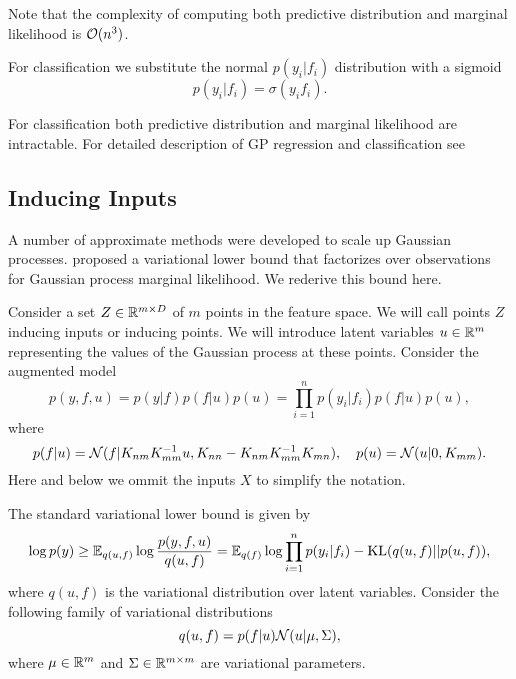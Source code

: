   Note that the complexity of computing both predictive distribution and 
  marginal likelihood is $\mathcal{O}(n^3)$.

  For classification we substitute the normal $p(y_i | f_i)$ distribution
  with a sigmoid
  \[
    p(y_i | f_i) = \sigma(y_i f_i).
  \]

  For classification both predictive distribution and marginal likelihood
  are intractable. For detailed description of GP regression and 
  classification see \citet{rasmussen2006}

\subsection{Inducing Inputs}
\label{inducing_inputs}

  A number of approximate methods were developed to scale up Gaussian processes.
  \citet{hensman2013} proposed a variational lower bound that factorizes over
  observations for Gaussian process marginal likelihood. We rederive 
  this bound here.

  Consider a set $Z \in \mathbb{R}^{m \times D}$ of $m$ points in the feature space. 
  We will call points $Z$ inducing inputs or inducing points.
  We will introduce latent variables $u \in \mathbb{R}^m$ representing the values of 
  the Gaussian process at these points. Consider the augmented model
  \[
    p(y, f, u) = p(y | f) p(f | u) p(u) = \prod_{i = 1}^ n p(y_i | f_i) p(f | u) p(u),
  \]
  where 
  \begin{equation}
  \label{priors}
    p(f | u) = \mathcal{N}(f | K_{nm} K_{mm}^{-1} u, K_{nn} - K_{nm} K_{mm}^{-1} K_{mn}),~~~p(u)=
    \mathcal{N}(u | 0, K_{mm}).
  \end{equation}
  Here and below we ommit the inputs $X$ to simplify the notation.
 
  The standard variational lower bound is given by
  \begin{equation}
  \label{standard_elbo}
    \log p(y) \ge \mathbb{E}_{q(u, f)} \log \frac {p(y, f, u)} {q(u, f)} = 
    \mathbb{E}_{q(f)} \log \prod_{i=1}^n p(y_i | f_i) - \mbox{KL}(q(u, f) || p(u, f)),
  \end{equation}
  where $q(u, f)$ is the variational distribution over latent variables.
  Consider the following family of variational distributions
  \begin{equation}
  \label{var_family}
    q(u, f) = p(f | u) \mathcal{N}(u | \mu, \Sigma),
  \end{equation}
  where $\mu \in \mathbb{R}^m$ and $\Sigma \in \mathbb{R}^{m \times m}$ are variational
  parameters. 
  
